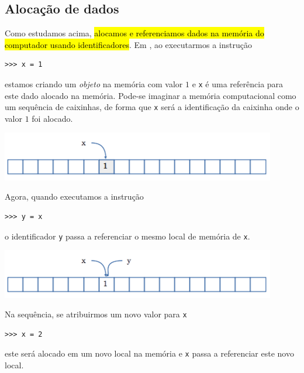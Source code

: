 \subsection{Alocação de dados}

Como estudamos acima, \hl{alocamos e referenciamos dados na memória do computador usando identificadores}. Em {\python}, ao executarmos a instrução

\begin{lstlisting}
>>> x = 1
\end{lstlisting}

estamos criando um \emph{objeto} na memória com valor $1$ e \lstinline+x+ é uma referência para este dado alocado na memória. Pode-se imaginar a memória computacional como um sequência de caixinhas, de forma que \lstinline+x+ será a identificação da caixinha onde o valor $1$ foi alocado.

\begin{center}
  \includegraphics[max width=0.9\textwidth]{./cap_lingua/dados/fig_aloc_mem/xRecebe1}
\end{center}

Agora, quando executamos a instrução

\begin{lstlisting}
>>> y = x 
\end{lstlisting}

o identificador \lstinline+y+ passa a referenciar o mesmo local de memória de \lstinline+x+.

\begin{center}
  \includegraphics[max width=0.9\textwidth]{./cap_lingua/dados/fig_aloc_mem/yRecebex}
\end{center}

Na sequência, se atribuirmos um novo valor para \lstinline+x+

\begin{lstlisting}
>>> x = 2
\end{lstlisting}

este será alocado em um novo local na memória e \lstinline+x+ passa a referenciar este novo local.

